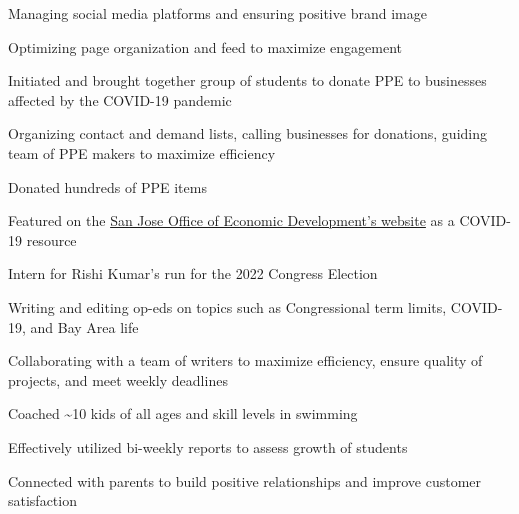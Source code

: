 \documentclass[letterpaper]{resume-shreeram}
\begin{document}
\begin{compactitem}
    \item Managing social media platforms and ensuring positive brand
      image

    \item Optimizing page organization and feed to maximize engagement
\end{compactitem}

\begin{compactitem}
    \item Initiated and brought together group of students to donate PPE
      to businesses affected by the COVID-19 pandemic

    \item Organizing contact and demand lists, calling businesses for
      donations, guiding team of PPE makers to maximize efficiency

    \item Donated hundreds of PPE items

    \item Featured on the
      \href{https://www.sjeconomy.com/why-san-jose/covid-19-guidance/local-suppliers}{San
      Jose Office of Economic Development's website} as a COVID-19
      resource
\end{compactitem}

\begin{compactitem}
    \item Intern for Rishi Kumar's run for the 2022 Congress Election

    \item Writing and editing op-eds on topics such as Congressional
      term limits, COVID-19, and Bay Area life

    \item Collaborating with a team of writers to maximize efficiency,
      ensure quality of projects, and meet weekly deadlines
\end{compactitem}

\begin{compactitem}
    \item Coached \textasciitilde{}10 kids of all ages and skill levels
      in swimming

    \item Effectively utilized bi-weekly reports to assess growth of
      students

    \item Connected with parents to build positive relationships and
      improve customer satisfaction
\end{compactitem}
\end{document}
